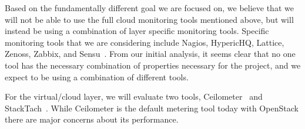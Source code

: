Based on the fundamentally different goal we are focused on, we believe that we will not be able to use the full cloud monitoring tools mentioned above, but will instead be using a combination of layer specific monitoring tools.  Specific monitoring tools that we are considering include Nagios, HypericHQ, Lattice, Zenoss, Zabbix, and Sensu~\cite{sandoval2012evaluation,Aceto2013}.  From our initial analysis, it seems clear that no one tool has the necessary combination of properties necessary for the project, and we expect to be using a combination of different tools. 

For the virtual/cloud layer, we will evaluate two tools, Ceilometer~\cite{ceilometer} and  StackTach~\cite{stacktach}. While Ceilometer is the default metering tool today with OpenStack there are major concerns about its performance. 
